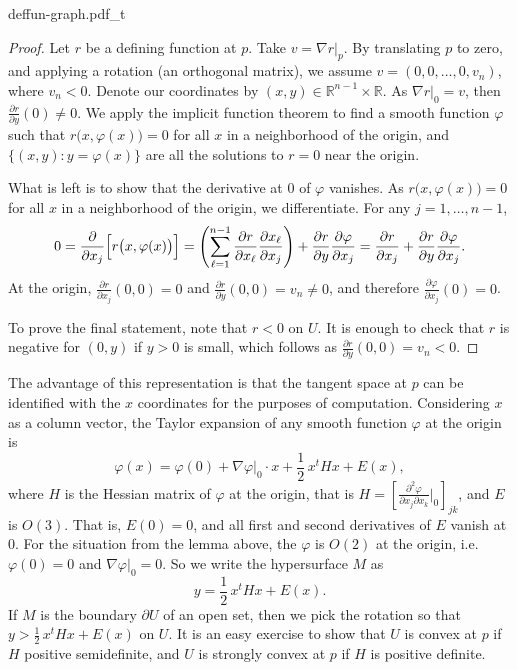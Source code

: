 \documentclass[12pt,openany]{book}
\newcommand{\R}{{\mathbb{R}}}
\theoremstyle{plain}
\theoremstyle{remark}
\theoremstyle{definition}
\newenvironment{myfig}{%
    \begin{center}
}{%
    \end{center}
}
\theoremstyle{exercise}
\theoremstyle{example}
\begin{document}
\begin{myfig}
{deffun-graph.pdf_t}
\end{myfig}

\begin{proof}
Let $r$ be a defining function at $p$.  Take $v = \nabla r|_p$.
By translating $p$ to zero, and applying a rotation (an orthogonal matrix),
we assume $v = (0,0,\ldots,0,v_n)$, where $v_n < 0$.  Denote our
coordinates by $(x,y) \in \R^{n-1} \times \R$.  As $\nabla r|_0 =
v$, then $\frac{\partial r}{\partial y}(0) \not= 0$.  We apply 
the implicit function theorem to find a
smooth function $\varphi$ such that
$r\bigl(x,\varphi(x)\bigr) = 0$ for all $x$ in a neighborhood of the
origin, and $\bigl\{ (x,y) : y=\varphi(x) \bigr\}$ are all the
solutions to $r = 0$ near the origin.

What is left is to show that the derivative at 0 of $\varphi$ vanishes.
As
$r\bigl(x,\varphi(x)\bigr) = 0$ for all $x$ in a neighborhood of the
origin, we differentiate.
For any $j=1,\ldots,n-1$,
\begin{equation*}
0 = 
\frac{\partial}{\partial x_j} \Bigl[
r\bigl(x,\varphi(x)\bigr) 
\Bigr]
=
\left(
\sum_{\ell=1}^{n-1}
\frac{\partial r}{\partial x_\ell}
\frac{\partial x_\ell}{\partial x_j}
\right)
+
\frac{\partial r}{\partial y}
\frac{\partial \varphi}{\partial x_j}
=
\frac{\partial r}{\partial x_j}
+
\frac{\partial r}{\partial y}
\frac{\partial \varphi}{\partial x_j} .
\end{equation*}
At the origin,
$\frac{\partial r}{\partial x_j}(0,0) = 0$ and
$\frac{\partial r}{\partial y}(0,0) = v_n \not= 0$, and therefore
$\frac{\partial \varphi}{\partial x_j}(0) = 0$.

To prove the final statement, note that
$r < 0$ on $U$.  It is enough to check that $r$ is
negative for $(0,y)$ if $y > 0$ is small, which follows as $\frac{\partial
r}{\partial y}(0,0) = v_n < 0$.
\end{proof}

The advantage of this representation is that the tangent space at $p$
can be identified with the $x$ coordinates for the purposes of computation.
Considering $x$ as a column vector, the Taylor expansion of any smooth function $\varphi$ at the origin is
\begin{equation*}
\varphi(x) = \varphi(0) + \nabla \varphi|_0 \cdot x + \frac{1}{2}\, x^t H x + E(x) ,
\end{equation*}
where $H$ is the Hessian matrix of $\varphi$ at the origin, that is $H = \left[
\frac{\partial^2 \varphi}{\partial x_j \partial x_k} \big|_{0} \right]_{jk}$,
and $E$ is $O(3)$.  That is, $E(0) = 0$, and
all first and second derivatives of $E$ vanish at $0$.
For the situation from the lemma above,
the $\varphi$ is $O(2)$ at the origin, i.e.\ $\varphi(0) = 0$
and $\nabla \varphi|_0 = 0$.  So we write the hypersurface
$M$ as
\begin{equation*}
y = \frac{1}{2}\, x^t H x + E(x) .
\end{equation*}
If $M$ is the boundary
$\partial U$ of an open set, then
we pick the rotation so that $y > \frac{1}{2}\,x^t H x + E(x)$ on $U$.
It is an easy exercise to show that $U$ is convex at $p$ if
$H$ positive semidefinite, and $U$ is strongly convex at $p$ if $H$ is positive definite.
\end{document}
